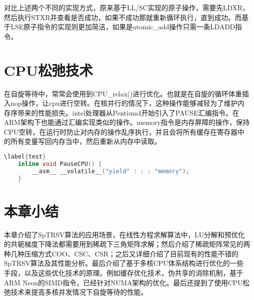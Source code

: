 对比上述两个不同的实现方式，原来基于LL/SC实现的原子操作，需要先LDXR，然后执行STXR并查看是否成功，如果不成功那就重新循环执行，直到成功。而基于LSE原子指令的实现则更加简洁，如果是atomic\_add操作只需一条LDADD指令。

\section{CPU松弛技术}

在自旋等待中，常常会使用到CPU\_relax()进行优化。也就是在自旋的循环体重插入nop操作，让cpu进行空转。在核并行的情况下，这种操作能够减轻为了维护内存序带来的性能损失。intel处理器从Pentium4开始引入了PAUSE汇编指令。在ARM架构下也能通过汇编实现类似的操作。memory指令是内存屏障的操作，保持CPU空转，在运行时防止对内存的操作乱序执行，并且会将所有缓存在寄存器中的所有变量写回内存当中，然后重新从内存中读取。


\begin{lstlisting}[language=c++]
    \label{test}
    inline void PauseCPU() { 
        __asm__ __volatile__("yield" : : : "memory"); 
    }
\end{lstlisting}

\section{本章小结}

本章介绍了SpTRSV算法的应用场景，在线性方程求解算法中，LU分解和预优化的共轭梯度下降法都需要用到稀疏下三角矩阵求解；然后介绍了稀疏矩阵常见的两种几种压缩方式COO、CSC、CSR；之后又详细介绍了目前现有的性能不错的SpTRSV算法及其性能分析。最后介绍了基于多核CPU体系结构进行优化的一些手段，以及这些优化技术的原理。例如缓存优化技术，伪共享的消除机制，基于ARM Neon的SIMD指令，已经针对NUMA架构的优化。最后还提到了使用CPU松弛技术来提高多核并发情况下自旋等待的性能。




\endinput